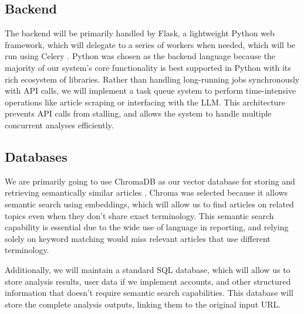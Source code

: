\documentclass[conference]{IEEEtran}
\begin{document}
\subsection{Backend}
The backend will be primarily handled by Flask, a lightweight Python web framework, which will delegate to a series of workers when needed, which will be run using Celery \cite{flask, celery-docs}. Python was chosen as the backend language because the majority of our system's core functionality is best supported in Python with its rich ecosystem of libraries. Rather than handling long-running jobs synchronously with API calls, we will implement a task queue system to perform time-intensive operations like article scraping or interfacing with the LLM. This architecture prevents API calls from stalling, and allows the system to handle multiple concurrent analyses efficiently.


\subsection{Databases}
We are primarily going to use ChromaDB as our vector database for storing and retrieving semantically similar articles \cite{chroma}. Chroma was selected because it allows semantic search using embeddings, which will allow us to find articles on related topics even when they don't share exact terminology. This semantic search capability is essential due to the wide use of language in reporting, and relying solely on keyword matching would miss relevant articles that use different terminology.

Additionally, we will maintain a standard SQL database, which will allow us to store analysis results, user data if we implement accounts, and other structured information that doesn't require semantic search capabilities. This database will store the complete analysis outputs, linking them to the original input URL.
\end{document}
